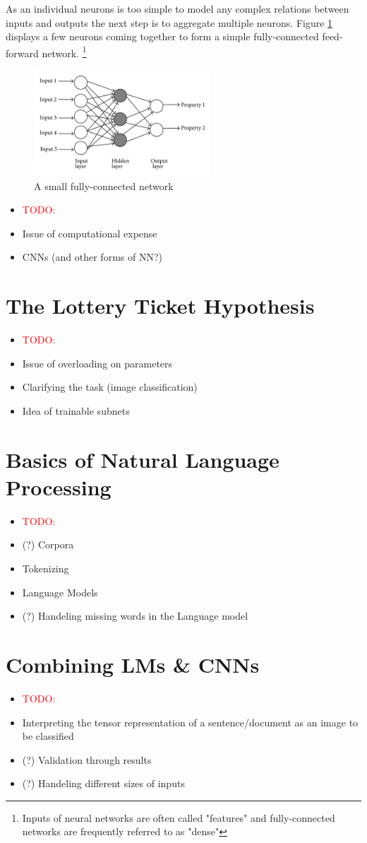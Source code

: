 As an individual neurons is too simple to model any complex relations between inputs
and outputs the next step is to aggregate multiple neurons. Figure \ref{fig:FFNetwork} displays a few neurons coming together to form a simple fully-connected feed-forward network.
\footnote{
	Inputs of neural networks are often called "features" and fully-connected networks are frequently referred to as "dense"	}
\begin{figure}
	\centering
		\includegraphics[height=150px]{gfx/Dense_FFNetwork.jpg}
		\caption{A small fully-connected network\\
			\cite{dense_network}}
		\label{fig:FFNetwork}
\end{figure}

\begin{itemize}
	\item \textcolor{red}{TODO:}
	\item Issue of computational expense
	\item CNNs (and other forms of NN?)
\end{itemize}
	
\section{The Lottery Ticket Hypothesis}
\begin{itemize}
	\item \textcolor{red}{TODO:}
	\item Issue of overloading on parameters
	\item Clarifying the task (image classification)
	\item Idea of trainable subnets
\end{itemize}

\section{Basics of Natural Language Processing}
\begin{itemize}
	\item \textcolor{red}{TODO:}
	\item (?) Corpora
	\item Tokenizing
	\item Language Models
	\item (?) Handeling missing words in the Language model
\end{itemize}

\section{Combining LMs \& CNNs}
\begin{itemize}
	\item \textcolor{red}{TODO:}
	\item Interpreting the tensor representation of a sentence/document as an image to be classified
	\item (?) Validation through results
	\item (?) Handeling different sizes of inputs
\end{itemize}